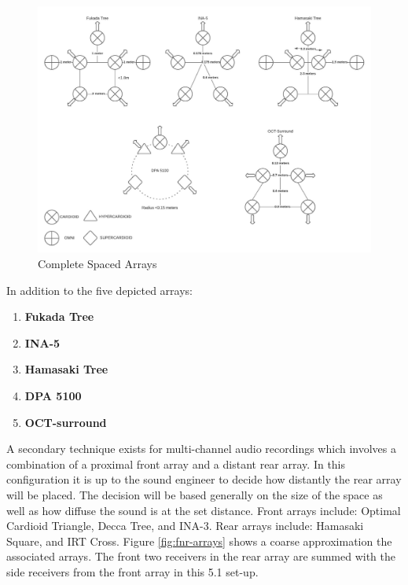\begin{figure}[ht!]%
\centering
\includegraphics[width=1.0\textwidth]{img/complete-spaced-arrays.jpeg} 
\caption{Complete Spaced Arrays}
\label{fig:c-spaced-arrays}

\end{figure}


In addition to the five depicted arrays:
\begin{enumerate}
    \item \textbf{Fukada Tree}
    \item \textbf{INA-5} 
    \item \textbf{Hamasaki Tree}
    \item \textbf{DPA 5100}
    \item \textbf{OCT-surround}
\end{enumerate}


A secondary technique exists for multi-channel audio recordings which involves a combination of a proximal front array and a distant rear array. In this configuration it is up to the sound engineer to decide how distantly the rear array will be placed. The decision will be based generally on the size of the space as well as how diffuse the sound is at the set distance. Front arrays include: Optimal Cardioid Triangle, Decca Tree, and INA-3. Rear arrays include: Hamasaki Square, and IRT Cross. Figure \ref{fig:fnr-arrays} shows a coarse approximation the associated arrays. The front two receivers in the rear array are summed with the side receivers from the front array in this 5.1 set-up. 

